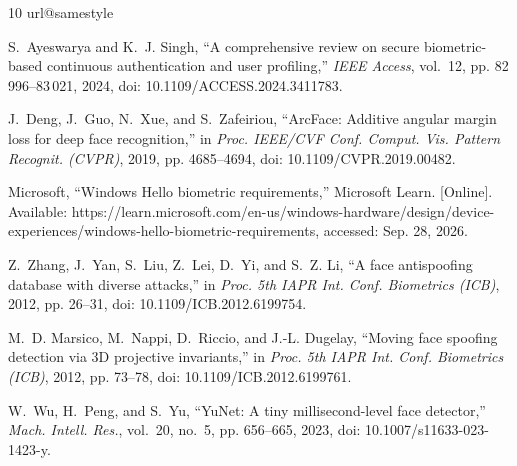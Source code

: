 \documentclass{ieeeaccess}
\begin{document}
\begin{thebibliography}{10}
\providecommand{\url}[1]{#1}
\csname url@samestyle\endcsname
\providecommand{\newblock}{\relax}
\providecommand{\bibinfo}[2]{#2}
\providecommand{\BIBentrySTDinterwordspacing}{\spaceskip=0pt\relax}
\providecommand{\BIBentryALTinterwordstretchfactor}{4}
\providecommand{\BIBentryALTinterwordspacing}{\spaceskip=\fontdimen2\font plus
\BIBentryALTinterwordstretchfactor\fontdimen3\font minus
  \fontdimen4\font\relax}
\providecommand{\BIBforeignlanguage}[2]{{%
\expandafter\ifx\csname l@#1\endcsname\relax
\typeout{** WARNING: IEEEtran.bst: No hyphenation pattern has been}%
\typeout{** loaded for the language `#1'. Using the pattern for}%
\typeout{** the default language instead.}%
\else
\language=\csname l@#1\endcsname
\fi
#2}}
\providecommand{\BIBdecl}{\relax}
\BIBdecl

S.~Ayeswarya and K.~J. Singh, ``A comprehensive review on secure
  biometric-based continuous authentication and user profiling,'' \emph{IEEE
  Access}, vol.~12, pp. 82\,996--83\,021, 2024, doi:
  10.1109/ACCESS.2024.3411783.

J.~Deng, J.~Guo, N.~Xue, and S.~Zafeiriou, ``{ArcFace}: Additive angular margin
  loss for deep face recognition,'' in \emph{Proc. IEEE/CVF Conf. Comput. Vis.
  Pattern Recognit. (CVPR)}, 2019, pp. 4685--4694, doi:
  10.1109/CVPR.2019.00482.

{Microsoft}, ``Windows {Hello} biometric requirements,'' Microsoft Learn.
  [Online]. Available:
  \url{https://learn.microsoft.com/en-us/windows-hardware/design/device-experiences/windows-hello-biometric-requirements},
  accessed: Sep. 28, 2026.

Z.~Zhang, J.~Yan, S.~Liu, Z.~Lei, D.~Yi, and S.~Z. Li, ``A face antispoofing
  database with diverse attacks,'' in \emph{Proc. 5th IAPR Int. Conf.
  Biometrics (ICB)}, 2012, pp. 26--31, doi: 10.1109/ICB.2012.6199754.

M.~D. Marsico, M.~Nappi, D.~Riccio, and J.-L. Dugelay, ``Moving face spoofing
  detection via {3D} projective invariants,'' in \emph{Proc. 5th IAPR Int.
  Conf. Biometrics (ICB)}, 2012, pp. 73--78, doi: 10.1109/ICB.2012.6199761.

W.~Wu, H.~Peng, and S.~Yu, ``{YuNet}: A tiny millisecond-level face detector,''
  \emph{Mach. Intell. Res.}, vol.~20, no.~5, pp. 656--665, 2023, doi:
  10.1007/s11633-023-1423-y.


\end{thebibliography}
\end{document}
